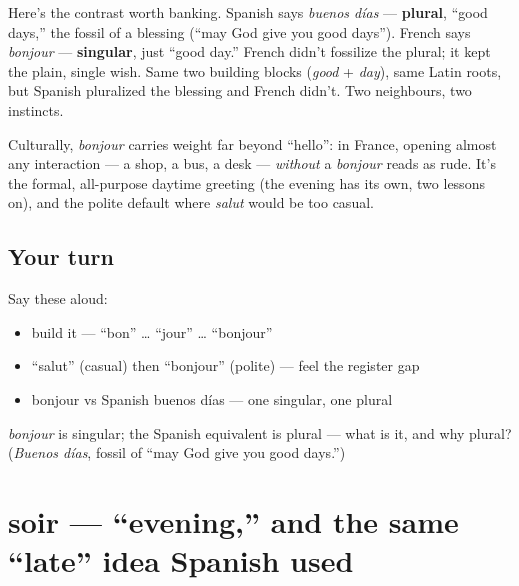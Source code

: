 \begin{culture}
Here's the contrast worth banking. Spanish says \emph{buenos días} — \textbf{plural}, \textquotedblleft{}good days,\textquotedblright{} the fossil of a blessing (\textquotedblleft{}may God give you good days\textquotedblright{}). French says \emph{bonjour} — \textbf{singular}, just \textquotedblleft{}good day.\textquotedblright{} French didn't fossilize the plural; it kept the plain, single wish. Same two building blocks (\emph{good} + \emph{day}), same Latin roots, but Spanish pluralized the blessing and French didn't. Two neighbours, two instincts.

Culturally, \emph{bonjour} carries weight far beyond \textquotedblleft{}hello\textquotedblright{}: in France, opening almost any interaction — a shop, a bus, a desk — \emph{without} a \emph{bonjour} reads as rude. It's the formal, all-purpose daytime greeting (the evening has its own, two lessons on), and the polite default where \emph{salut} would be too casual.
\end{culture}

\subsection*{Your turn}
Say these aloud:

\begin{itemize}
\raggedright
  \item build it — \textquotedblleft{}bon\textquotedblright{} … \textquotedblleft{}jour\textquotedblright{} … \textquotedblleft{}bonjour\textquotedblright{}
  \item \textquotedblleft{}salut\textquotedblright{} (casual) then \textquotedblleft{}bonjour\textquotedblright{} (polite) — feel the register gap
  \item bonjour vs Spanish buenos días — one singular, one plural
\end{itemize}

\begin{tcolorbox}[breakable,colback=teal!4,colframe=teal!35!black,title={Before you move on}]
\emph{bonjour} is singular; the Spanish equivalent is plural — what is it, and why plural? (\emph{Buenos días}, fossil of \textquotedblleft{}may God give you good days.\textquotedblright{})
\end{tcolorbox}
\section[soir]{soir — \textquotedblleft{}evening,\textquotedblright{} and the same \textquotedblleft{}late\textquotedblright{} idea Spanish used}

